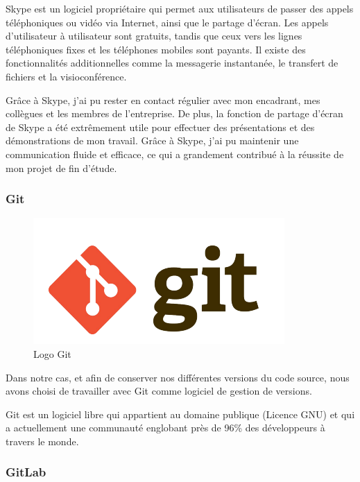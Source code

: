 Skype est un logiciel propriétaire qui permet aux utilisateurs de passer des appels téléphoniques ou vidéo via Internet, ainsi que le partage d'écran. Les appels d’utilisateur à utilisateur sont gratuits, tandis que ceux vers les lignes téléphoniques fixes et les téléphones mobiles sont payants. Il existe des fonctionnalités additionnelles comme la messagerie instantanée, le transfert de fichiers et la visioconférence. 

Grâce à Skype, j'ai pu rester en contact régulier avec mon encadrant, mes collègues et les membres de l'entreprise. De plus, la fonction de partage d'écran de Skype a été extrêmement utile pour effectuer des présentations et des démonstrations de mon travail. Grâce à Skype, j'ai pu maintenir une communication fluide et efficace, ce qui a grandement contribué à la réussite de mon projet de fin d’étude.

\subsubsection{Git}

\begin{figure}[H]
    \centering
    \includegraphics[scale=0.5]{Logos/git.png}
    \caption{Logo Git}
\end{figure}

Dans notre cas, et afin de conserver nos différentes versions du code source, nous avons
choisi de travailler avec Git comme logiciel de gestion de versions.

Git est un logiciel libre qui appartient au domaine publique (Licence GNU) et qui a
actuellement une communauté englobant près de 96\% des développeurs à travers le monde.

\subsubsection{GitLab}


